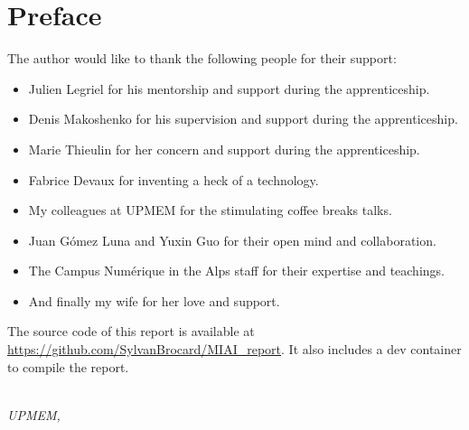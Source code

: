 \chapter*{Preface}

The author would like to thank the following people for their support:
\begin{itemize}
    \item Julien Legriel for his mentorship and support during the apprenticeship.
    \item Denis Makoshenko for his supervision and support during the apprenticeship.
    \item Marie Thieulin for her concern and support during the apprenticeship.
    \item Fabrice Devaux for inventing a heck of a technology.
    \item My colleagues at UPMEM for the stimulating coffee breaks talks.
    \item Juan Gómez Luna and Yuxin Guo for their open mind and collaboration.
    \item The Campus Numérique in the Alps staff for their expertise and teachings.
    \item And finally my wife for her love and support.
\end{itemize}

The source code of this report is available at \url{https://github.com/SylvanBrocard/MIAI_report}. It also includes a dev container to compile the report.

\begin{flushright}
{\makeatletter\itshape
    \@author \\
    UPMEM, \monthname{} \the\year{}
\makeatother}
\end{flushright}
